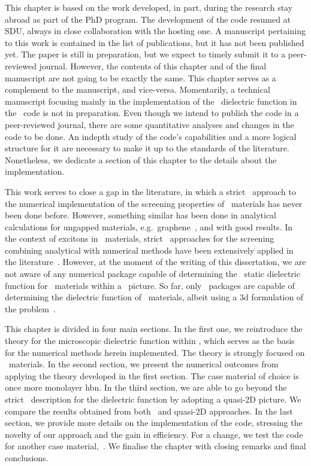 This chapter is based on the work developed, in part, during the research stay abroad as part of the PhD program.
The development of the code resumed at SDU, always in close collaboration with the hosting one.
A manuscript pertaining to this work is contained in the list of publications, but it has not been published yet.
The paper is still in preparation, but we expect to timely submit it to a peer-reviewed journal.
However, the contents of this chapter and of the final manuscript are not going to be exactly the same.
This chapter serves as a complement to the manuscript, and vice-versa.
Momentarily, a technical manuscript focusing mainly in the implementation of the \bd~dielectric function in the \xatu~code is not in preparation.
Even though we intend to publish the code in a peer-reviewed journal, there are some quantitative analyses and changes in the code to be done.
An indepth study of the code's capabilities and a more logical structure for it are necessary to make it up to the standards of the literature.
Nonetheless, we dedicate a section of this chapter to the details about the implementation.

This work serves to close a gap in the literature, in which a strict \bd~approach to the numerical implementation of the screening properties of \bd~materials has never been done before.
However, something similar has been done in analytical calculations for ungapped materials, e.g.~graphene~\cite{Hwang_2007,Sohier_Calandra_Mauri_2015}, and  with good results.
In the context of excitons in \bd~materials, strict \bd~approaches for the screening combining analytical with numerical methods have been extensively applied in the literature~\cite{Xatu,Cudazzo_2011,Ninhos_Tserkezis_Mortensen_Peres_2024,Henriques_Amorim_Ribeiro_Peres_2022,Henriques_Epstein_Peres_2022,Henriques_Peres_2020,Thygesen_2017}.
However, at the moment of the writing of this dissertation, we are not aware of any numerical package capable of determining the \bd~static dielectric function for \bd~materials within a \bd~picture.
So far, only \abinit~packages are capable of determining the dielectric function of \bd~materials, albeit using a \gls{3d} formulation of the problem~\cite{BerkeleyGW,GPAW_2025,Yambo_2009,Siesta_2020,Abinit_2016,Prandini_Galante_Marzari_Umari_2019}.

This chapter is divided in four main sections.
In the first one, we reintroduce the theory for the microscopic dielectric function within \rpa\@, which serves as the basis for the numerical methods herein implemented.
The theory is strongly focused on \bd~materials.
In the second section, we present the numerical outcomes from applying the theory developed in the first section.
The case material of choice is once more monolayer \gls{hbn}.
In the third section, we are able to go beyond the strict \bd~description for the dielectric function by adopting a quasi-2D picture.
We compare the results obtained from both \bd~and quasi-2D approaches.
In the last section, we provide more details on the implementation of the code, stressing the novelty of our approach and the gain in efficiency.
For a change, we test the code for another case material, \,.
We finalise the chapter with closing remarks and final conclusions.

